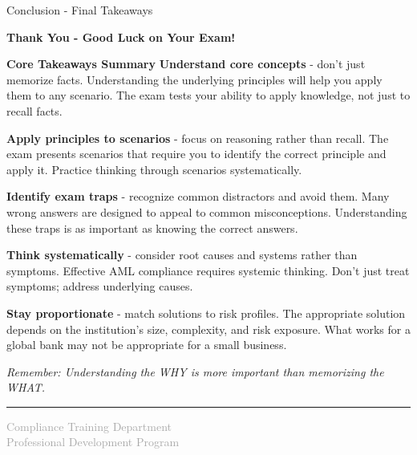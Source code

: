 \documentclass[5pt]{beamer}
\begin{document}
	\begin{frame}{Conclusion - Final Takeaways}
		\begin{center}
			\tiny \textbf{Thank You - Good Luck on Your Exam!}
		\end{center}
		
		\vspace{0.05cm}
		\begin{block}{\tiny \textbf{Core Takeaways Summary}}
			\tiny \textbf{Understand core concepts} - don't just memorize facts. Understanding the underlying principles will help you apply them to any scenario. The exam tests your ability to apply knowledge, not just to recall facts.
			
			\textbf{Apply principles to scenarios} - focus on reasoning rather than recall. The exam presents scenarios that require you to identify the correct principle and apply it. Practice thinking through scenarios systematically.
			
			\textbf{Identify exam traps} - recognize common distractors and avoid them. Many wrong answers are designed to appeal to common misconceptions. Understanding these traps is as important as knowing the correct answers.
			
			\textbf{Think systematically} - consider root causes and systems rather than symptoms. Effective AML compliance requires systemic thinking. Don't just treat symptoms; address underlying causes.
			
			\textbf{Stay proportionate} - match solutions to risk profiles. The appropriate solution depends on the institution's size, complexity, and risk exposure. What works for a global bank may not be appropriate for a small business.
		\end{block}
		
		\vspace{0.05cm}
		\begin{center}
			\tiny \textit{Remember: Understanding the WHY is more important than memorizing the WHAT.}
			\vspace{0.05cm}
			\rule{4cm}{0.3pt}
			\vspace{0.05cm}
			\textcolor{darkgray}{\tiny Compliance Training Department} \\
			\textcolor{darkgray}{\tiny Professional Development Program}
		\end{center}
	\end{frame}
	
	
\end{document}
